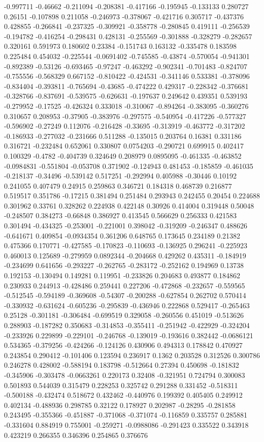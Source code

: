 -0.997711 -0.46662 -0.211094 -0.208381 -0.417166 -0.195945 -0.133133 0.280727 0.26151 -0.107898 0.211058 -0.246973 -0.378067 -0.421716 0.305717 -0.437376 0.428855 -0.266841 -0.237325 -0.309921 -0.358778 -0.280845 0.419111 -0.256539 -0.194782 -0.416254 -0.298431 0.428131 -0.255569 -0.301888 -0.328279 -0.282657 0.320161 0.591973 0.180602 0.23384 -0.151743 0.163132 -0.335478 0.183598 0.225484 0.454032 -0.225544 -0.0691402 -0.745585 -0.43874 -0.570054 -0.941301 -0.892389 -0.53126 -0.693465 -0.97247 -0.463292 -0.902341 -0.701483 -0.824707 -0.755556 -0.568329 0.667152 -0.810422 -0.424531 -0.341146 0.533381 -0.378096 -0.834404 -0.393811 -0.765694 -0.43685 -0.474222 0.429317 -0.228342 -0.376681 -0.328766 -0.837691 -0.539575 -0.626631 -0.197637 0.249642 0.439351 0.539193 -0.279952 -0.17525 -0.426324 0.333018 -0.310067 -0.894264 -0.383095 -0.360276 0.310657 0.208953 -0.37905 -0.383976 -0.297575 -0.540954 -0.417226 -0.577327 -0.596902 -0.27249 0.112076 -0.216428 -0.33695 -0.313919 -0.463772 -0.317202 -0.186933 -0.277032 -0.231666 0.511288 -0.135015 0.203764 0.16381 0.331186 0.316721 -0.232484 0.652061 0.330807 0.0754203 -0.290721 0.699915 0.402417 0.100329 -0.4782 -0.404739 0.324649 0.208979 0.0895095 -0.461335 -0.463852 -0.0984831 -0.551804 -0.053708 0.371902 -0.124943 0.481453 -0.185859 -0.461035 -0.218137 -0.34496 -0.539142 0.517251 -0.292994 0.405988 -0.30446 0.10192 0.241055 0.407479 0.24915 0.259863 0.346721 0.184318 0.468739 0.216877 0.519517 0.351786 -0.17215 0.381494 0.251484 0.293943 0.242455 0.20454 0.224688 0.301962 0.33761 0.328262 0.224938 0.422148 0.30926 0.414004 0.319448 0.50048 -0.248507 0.384273 -0.66848 0.386927 0.413545 0.566629 0.256333 0.421583 0.301494 -0.434325 -0.253001 -0.221001 0.398042 -0.319209 -0.246347 0.488626 -0.641671 0.409854 -0.0934354 0.361206 0.648765 0.173645 0.234189 0.21382 0.475366 0.170771 -0.427585 -0.170823 -0.110693 -0.136925 0.296241 -0.225923 0.460013 0.125689 -0.279959 0.0892344 -0.204668 0.429262 0.435311 -0.184919 -0.234699 0.641656 -0.293227 -0.262765 -0.283172 -0.252162 0.194969 0.13738 0.192153 -0.130494 0.149281 0.119951 -0.233826 0.204683 0.493877 0.184862 0.230933 0.244913 -0.428486 0.259441 0.227206 -0.472868 -0.232657 -0.559565 -0.512545 -0.594189 -0.369608 -0.54307 -0.200288 -0.627854 0.262702 0.570414 -0.330932 -0.631624 -0.605236 -0.295839 -0.436946 0.222868 0.529417 -0.265463 0.25128 -0.301181 -0.306484 -0.699519 0.329058 -0.260556 0.451019 -0.513626 0.288903 -0.187282 0.350683 -0.314853 -0.355411 -0.251942 -0.422929 -0.324204 -0.233926 0.229899 -0.229101 -0.246768 -0.139019 -0.193616 0.382442 -0.0686121 0.534365 -0.379256 -0.424266 -0.124126 0.430906 0.494313 0.178842 0.470927 0.243854 0.290412 -0.101406 0.123594 0.236917 0.1362 0.203528 0.312526 0.300786 0.246278 0.428002 -0.588194 0.183798 -0.512664 0.27394 0.450698 -0.181832 -0.345906 -0.303478 -0.0663261 0.220173 0.32408 -0.321951 0.724794 0.300083 0.501893 0.544039 0.315479 0.228253 0.325742 0.291288 0.331452 -0.518311 -0.500188 -0.432474 0.518672 0.432462 -0.440976 0.199392 0.405405 0.249912 0.402134 -0.488936 0.298785 0.32122 0.178927 0.202987 -0.28295 -0.281858 0.243495 -0.355366 -0.451887 -0.371068 -0.371074 -0.116859 0.335757 0.285881 -0.331604 0.884919 0.755001 -0.259271 -0.0988086 -0.291423 0.335522 0.343918 0.423219 0.266355 0.346396 0.254865 0.376676 